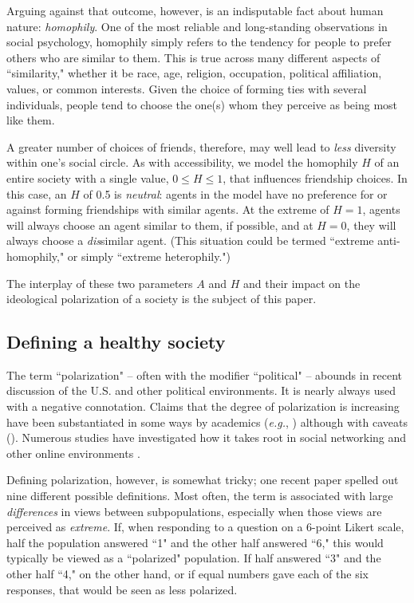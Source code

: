 Arguing against that outcome, however, is an indisputable fact about human
nature: \textit{homophily}. One of the most reliable and long-standing
observations in social psychology, homophily simply refers to the tendency for
people to prefer others who are similar to them.\cite{mcpherson_birds_2001}
This is true across many different aspects of ``similarity," whether it be
race, age, religion, occupation, political affiliation, values, or common
interests. Given the choice of forming ties with several individuals, people
tend to choose the one(s) whom they perceive as being most like them. 

A greater number of choices of friends, therefore, may well lead to
\textit{less} diversity within one's social circle. As with accessibility, we
model the homophily $H$ of an entire society with a single value, $0 \leq H
\leq 1$, that influences friendship choices. In this case, an $H$ of 0.5 is
\textit{neutral}: agents in the model have no preference for or against
forming friendships with similar agents. At the extreme of $H=1$, agents will
always choose an agent similar to them, if possible, and at $H=0$, they will
always choose a \textit{dis}similar agent. (This situation could be termed
``extreme anti-homophily," or simply ``extreme heterophily.")

The interplay of these two parameters $A$ and $H$ and their impact on the
ideological polarization of a society is the subject of this paper.

\subsection{Defining a healthy society}

The term ``polarization" -- often with the modifier ``political" -- abounds in
recent discussion of the U.S. and other political
environments.\cite{campbell_source_2016,french_were_2017,dimock_political_2014}
It is nearly always used with a negative connotation. Claims that the degree
of polarization is increasing have been substantiated in some ways by
academics (\textit{e.g.},
\cite{baldassarri_partisans_2008,prior_media_2013,abramowitz_new_2015})
although with caveats
(\cite{baldassarri_dynamics_2007,fiorina_political_2008,abrams_party_2015}). Numerous studies
have investigated how it takes root in social networking and other online
environments
\cite{mousavi_role_2014,conover_political_2011,adamic_political_2005,hargittai_cross-ideological_2008}.

Defining polarization, however, is somewhat tricky; one recent paper spelled
out nine different possible definitions\cite{bramson_disambiguation_2016}.
Most often, the term is associated with large \textit{differences} in views
between subpopulations, especially when those views are perceived as
\textit{extreme}. If, when responding to a question on a 6-point Likert scale,
half the population answered ``1" and the other half answered ``6," this would
typically be viewed as a ``polarized" population. If half answered ``3" and
the other half ``4," on the other hand, or if equal numbers gave each of the
six responses, that would be seen as less polarized.

